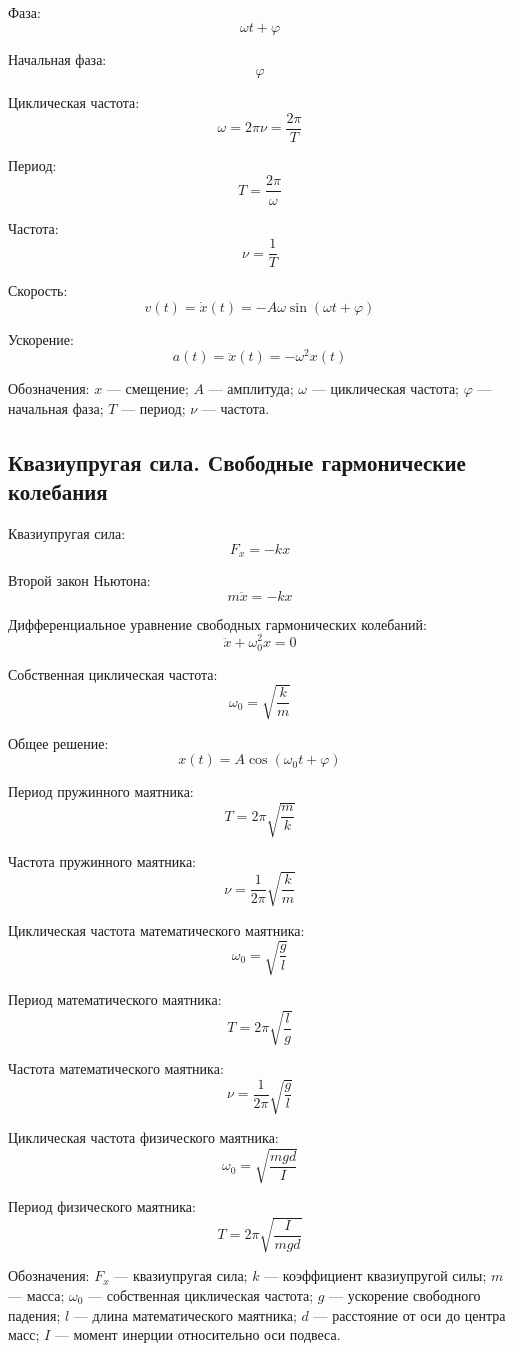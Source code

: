 \documentclass[a4paper,12pt]{article}
\begin{document}
Фаза:
\[
\omega t + \varphi
\]

Начальная фаза:
\[
\varphi
\]

Циклическая частота:
\[
\omega = 2\pi \nu = \frac{2\pi}{T}
\]

Период:
\[
T = \frac{2\pi}{\omega}
\]

Частота:
\[
\nu = \frac{1}{T}
\]

Скорость:
\[
v\left(t\right) = \dot x\left(t\right) = -A\omega \sin\left(\omega t + \varphi\right)
\]

Ускорение:
\[
a\left(t\right) = \ddot x\left(t\right) = -\omega^2 x\left(t\right)
\]

Обозначения:  
\(x\) — смещение;  
\(A\) — амплитуда;  
\(\omega\) — циклическая частота;  
\(\varphi\) — начальная фаза;  
\(T\) — период;  
\(\nu\) — частота.

\subsection{Квазиупругая сила. Свободные гармонические колебания}

Квазиупругая сила:
\[
F_x = -kx
\]

Второй закон Ньютона:
\[
m\ddot x = -kx
\]

Дифференциальное уравнение свободных гармонических колебаний:
\[
\ddot x + \omega_0^2 x = 0
\]

Собственная циклическая частота:
\[
\omega_0 = \sqrt{\frac{k}{m}}
\]

Общее решение:
\[
x\left(t\right) = A \cos\left(\omega_0 t + \varphi\right)
\]

Период пружинного маятника:
\[
T = 2\pi \sqrt{\frac{m}{k}}
\]

Частота пружинного маятника:
\[
\nu = \frac{1}{2\pi}\sqrt{\frac{k}{m}}
\]

Циклическая частота математического маятника:
\[
\omega_0 = \sqrt{\frac{g}{l}}
\]

Период математического маятника:
\[
T = 2\pi \sqrt{\frac{l}{g}}
\]

Частота математического маятника:
\[
\nu = \frac{1}{2\pi}\sqrt{\frac{g}{l}}
\]

Циклическая частота физического маятника:
\[
\omega_0 = \sqrt{\frac{mgd}{I}}
\]

Период физического маятника:
\[
T = 2\pi \sqrt{\frac{I}{mgd}}
\]

Обозначения:  
\(F_x\) — квазиупругая сила;  
\(k\) — коэффициент квазиупругой силы;  
\(m\) — масса;  
\(\omega_0\) — собственная циклическая частота;  
\(g\) — ускорение свободного падения;  
\(l\) — длина математического маятника;  
\(d\) — расстояние от оси до центра масс;  
\(I\) — момент инерции относительно оси подвеса.
\end{document}
